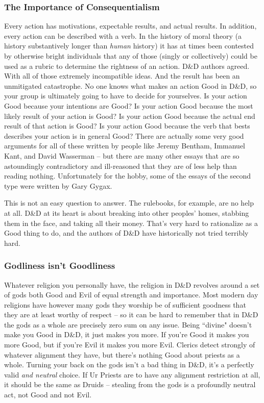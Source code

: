 \subsubsection{The Importance of Consequentialism}
Every action has motivations, expectable results, and actual results. In addition, every action can be described with a verb. In the history of moral theory (a history substantively longer than \textit{human} history) it has at times been contested by otherwise bright individuals that any of those (singly or collectively) could be used as a rubric to determine the rightness of an action. D\&D authors agreed. With all of those extremely incompatible ideas. And the result has been an unmitigated catastrophe. No one knows what makes an action Good in D\&D, so your group is ultimately going to have to decide for yourselves. Is your action Good because your intentions are Good? Is your action Good because the most likely result of your action is Good? Is your action Good because the actual end result of that action is Good? Is your action Good because the verb that bests describes your action is in general Good? There are actually some very good arguments for all of these written by people like Jeremy Bentham, Immanuel Kant, and David Wasserman -- but there are many other essays that are so astoundingly contradictory and ill-reasoned that they are of less help than reading nothing. Unfortunately for the hobby, some of the essays of the second type were written by Gary Gygax.

This is not an easy question to answer. The rulebooks, for example, are no help at all. D\&D at its heart is about breaking into other peoples' homes, stabbing them in the face, and taking all their money. That's very hard to rationalize as a Good thing to do, and the authors of D\&D have historically not tried terribly hard.

\subsubsection{Godliness isn't Goodliness}
Whatever religion you personally have, the religion in D\&D revolves around a set of gods both Good and Evil of equal strength and importance. Most modern day religions have however many gods they worship be of sufficient goodness that they are at least worthy of respect -- so it can be hard to remember that in D\&D the gods as a whole are precisely zero sum on any issue. Being ``divine" doesn't make you Good in D\&D, it just makes you more. If you're Good it makes you more Good, but if you're Evil it makes you more Evil. Clerics detect strongly of whatever alignment they have, but there's nothing Good about priests as a whole. Turning your back on the gods isn't a bad thing in D\&D, it's a perfectly valid \textit{and neutral} choice. If Ur Priests are to have any alignment restriction at all, it should be the same as Druids -- stealing from the gods is a profoundly neutral act, not Good and not Evil.

